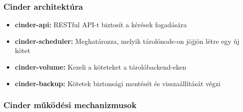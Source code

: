 \documentclass[a4paper,12pt]{article}
\begin{document}
    \subsubsection{Cinder architektúra}

    \begin{itemize}
        \item \textbf{cinder-api:} RESTful API-t biztosít a kérések fogadására
        \item \textbf{cinder-scheduler:} Meghatározza, melyik tárolónode-on jöjjön létre egy új kötet
        \item \textbf{cinder-volume:} Kezeli a köteteket a tárolóbackend-eken
        \item \textbf{cinder-backup:} Kötetek biztonsági mentését és visszaállítását végzi
    \end{itemize}

    \subsubsection{Cinder működési mechanizmusok}
\end{document}
